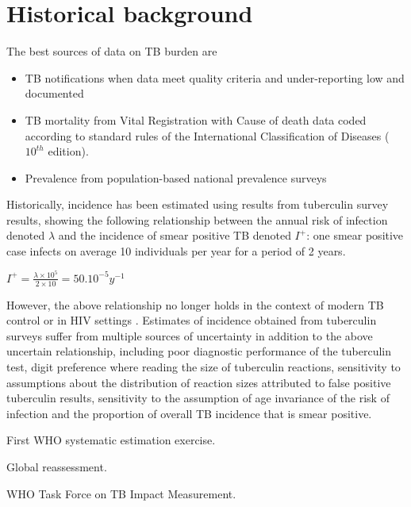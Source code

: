 \section{Historical background}

The best sources of data on TB burden are 
\begin{itemize}
\item TB notifications when data meet quality criteria and under-reporting low and documented
\item TB mortality from Vital Registration with Cause of death data coded according to standard rules of the International Classification of Diseases ($10^{th}$ edition).
\item Prevalence from population-based national prevalence surveys
\end{itemize}

Historically, incidence has been estimated using results from tuberculin survey results\cite{Styblo1985}, showing the following relationship between the annual risk of infection denoted $\lambda$ and the incidence of smear positive TB denoted $I^+$: one smear positive case infects on average 10 individuals per year for a period of 2 years.

$I^+ = \frac{\lambda \times 10^5}{2 \times 10} = 50.10^{-5} y^{-1}$

However, the above relationship no longer holds in the context of modern TB control or in HIV settings \cite{18235886}. Estimates of incidence obtained from tuberculin surveys suffer from multiple sources of uncertainty in addition to the above uncertain relationship, including poor diagnostic performance of the tuberculin test, digit preference where reading the size of tuberculin reactions, sensitivity to assumptions about the distribution of reaction sizes attributed to false positive tuberculin results, sensitivity to the assumption of age invariance of the risk of infection and the proportion of overall TB incidence that is smear positive. 

First WHO systematic estimation exercise\cite{1600578}.

Global reassessment\cite{10517722}.

WHO Task Force on TB Impact Measurement\cite{18201929}.



  
  
  
  
  
  
  
  
  
  
  